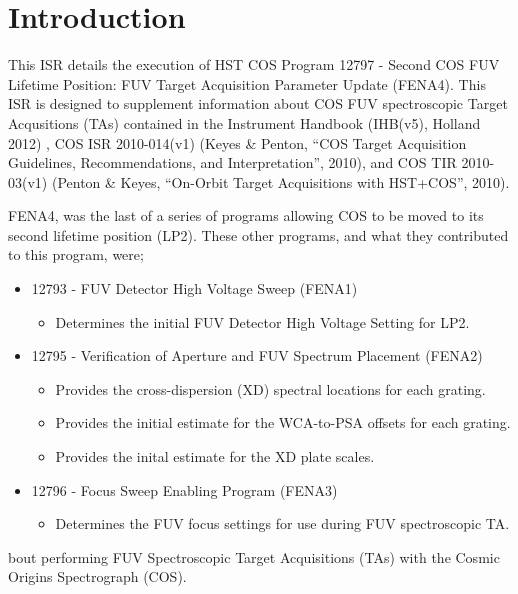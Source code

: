 \section{Introduction}

This ISR details the execution of HST COS Program 12797 - Second COS FUV Lifetime Position: FUV Target Acquisition Parameter Update (FENA4). This ISR is designed to supplement information about COS FUV spectroscopic Target Acqusitions (TAs) contained in the Instrument Handbook (IHB(v5), Holland 2012) , COS ISR 2010-014(v1) (Keyes \& Penton, ``COS Target Acquisition Guidelines, Recommendations, and Interpretation'', 2010), and COS TIR 2010-03(v1) (Penton \& Keyes, ``On-Orbit Target Acquisitions with HST+COS'', 2010).

FENA4, was the last of a series of programs allowing COS to be moved to its second lifetime position (LP2). These other programs, and what they contributed to this program, were;
\begin{itemize}
\item{12793} - FUV Detector High Voltage Sweep (FENA1)
	\begin{itemize}
	\item{Determines the initial FUV Detector High Voltage Setting for LP2.}
	\end{itemize}
\item{12795} - Verification of Aperture and FUV Spectrum Placement (FENA2)
	\begin{itemize}
	\item{Provides the cross-dispersion (XD) spectral locations for each grating.}
	\item{Provides the initial estimate for the WCA-to-PSA offsets for each grating.}
	\item{Provides the inital estimate for the XD plate scales.}
	\end{itemize}
\item{12796} - Focus Sweep Enabling Program (FENA3)
	\begin{itemize}
	\item{Determines the FUV focus settings for use during FUV spectroscopic TA.}
	\end{itemize}
\end{itemize}

bout performing FUV Spectroscopic Target Acquisitions (TAs) with the Cosmic Origins Spectrograph (COS).
